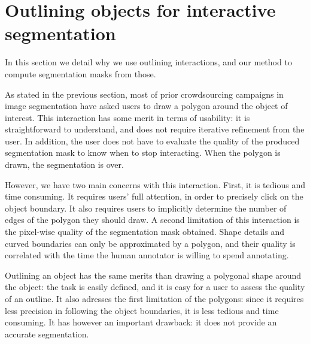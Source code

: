 



\section{Outlining objects for interactive segmentation}%
\label{sec:method}


In this section we detail why we use outlining interactions,
and our method to compute segmentation masks from those.


As stated in the previous section, most of prior crowdsourcing
campaigns in image segmentation have asked users to draw
a polygon around the object of interest.
This interaction has some merit in terms of usability:
it is straightforward to understand,
and does not require iterative refinement from the user.
In addition, the user does not have to evaluate the quality
of the produced segmentation mask to know when to stop interacting.
When the polygon is drawn, the segmentation is over.


However, we have two main concerns with this interaction.
First, it is tedious and time consuming. It requires users' full
attention, in order to precisely click on the object boundary.
It also requires users to implicitly determine the number
of edges of the polygon they should draw.
A second limitation of this interaction is the pixel-wise quality
of the segmentation mask obtained.
Shape details and curved boundaries can only be approximated by a polygon,
and their quality is correlated with the time
the human annotator is willing to spend annotating.


Outlining an object has the same merits than drawing a polygonal shape
around the object: the task is easily defined,
and it is easy for a user to assess the quality of an outline.
It also adresses the first limitation of the polygons:
since it requires less precision in following the object boundaries,
it is less tedious and time consuming.
It has however an important drawback:
it does not provide an accurate segmentation.


